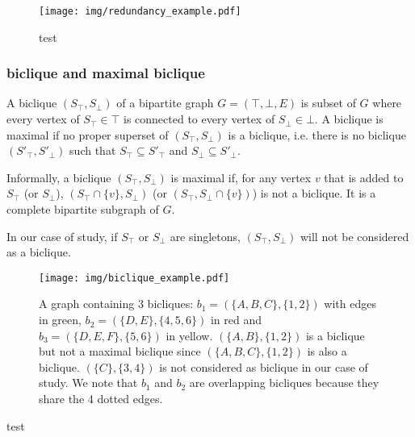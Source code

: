 \documentclass[table]{report}
\begin{document}
\begin{figure}[h]%
\centering
\texttt{[image: img/redundancy\_example.pdf]}
\caption{test}

\label{fig:redundancy_example}
\end{figure}
\FloatBarrier





\subsubsection{biclique and maximal biclique}

A biclique $(S_\top,S_\bot)$ of a bipartite graph $G = (\top, \bot, E)$ is subset of $G$  where every vertex of $S_\top \in \top $ is connected to every vertex of $S_\bot \in \bot$. A biclique is maximal if no proper superset of $(S_\top,S_\bot)$ is a biclique, i.e. there is no biclique $(S'_\top, S'_\bot)$ such that $S_\top \subseteq S'_\top$ and $S_\bot \subseteq S'_\bot$.

Informally, a biclique $(S_\top,S_\bot)$ is maximal if, for any vertex $v$ that is added to $S_\top$ (or $S_\bot$), $(S_\top \cap \{v\},S_\bot)$  (or $(S_\top,S_\bot \cap \{v\})$) is not a biclique. It is a complete bipartite subgraph of $G$.

In our case of study, if $S_\top$ or $S_\bot$ are singletons, $(S_\top,S_\bot)$ will not be considered as a biclique.

\begin{figure}[h]%
\centering
\texttt{[image: img/biclique\_example.pdf]}
\caption{A graph containing 3 bicliques: $b_1 = (\{A,B,C\}, \{1,2\})$ with edges in green, $b_2 = (\{D,E\}, \{4,5,6\})$ in red and  $b_3 = (\{D,E,F\}, \{5,6\})$ in yellow. $(\{A,B\}, \{1,2\})$ is a biclique but not a maximal biclique since $(\{A,B,C\}, \{1,2\})$ is also a biclique. $(\{C\}, \{3,4\})$ is not considered as biclique in our case of study. We note that $b_1$ and $b_2$ are overlapping bicliques because they share the 4 dotted edges.}
\label{fig:biclique_example}
\end{figure}
\FloatBarrier

test
\end{document}
